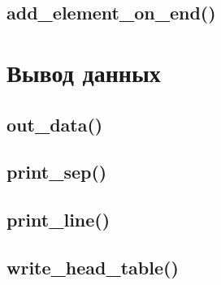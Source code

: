 \documentclass[12pt, a4paper]{article}
\begin{document}
\subsection{add\_element\_on\_end()}






\section{Вывод данных}



\subsection{out\_data()}







\subsection{print\_sep()}







\subsection{print\_line()}







\subsection{write\_head\_table()}
\end{document}
